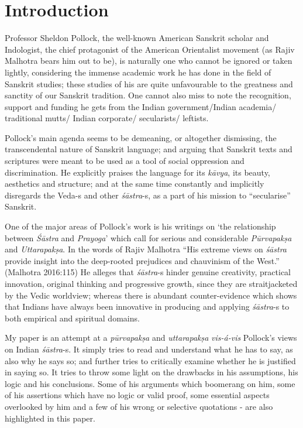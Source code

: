 \vskip -12pt

\section*{Introduction}

Professor Sheldon Pollock, the well-known American Sanskrit scholar and Indologist, the chief protagonist of the American Orientalist movement (as Rajiv Malhotra bears him out to be), is naturally one who cannot be ignored or taken lightly, considering the immense academic work he has done in the field of Sanskrit studies; these studies of his are quite unfavourable to the greatness and sanctity of our Sanskrit tradition. One cannot also miss to note the recognition, support and funding he gets from the Indian government/Indian academia/ traditional mutts/ Indian corporate/ secularists/ leftists.

Pollock's main agenda seems to be demeaning, or altogether dismissing, the transcendental nature of Sanskrit language; and arguing that Sanskrit texts and scriptures were meant to be used as a tool of social oppression and discrimination. He explicitly praises the language for its {\sl kāvya}, its beauty, aesthetics and structure; and at the same time constantly and implicitly disregards the Veda-s and other {\sl śāstra}-s, as a part of his mission to ``secularise'' Sanskrit. 

One of the major areas of Pollock's work is his writings on `the relationship between {\sl Śāstra} and {\sl Prayoga}' which call for serious and considerable {\sl Pūrvapakṣa} and {\sl Uttarapakṣa}. In the words of Rajiv Malhotra ``His extreme views on {\sl śāstra} provide insight into the deep-rooted prejudices and chauvinism of the West.'' (Malhotra 2016:115) He alleges that {\sl śāstra}-s hinder genuine creativity, practical innovation, original thinking and progressive growth, since they are straitjacketed by the Vedic worldview; whereas there is abundant counter-evidence which shows that Indians have always been innovative in producing and applying {\sl śāstra}-s to both empirical and spiritual domains.

My paper is an attempt at a {\sl pūrvapakṣa} and {\sl uttarapakṣa} {\em vis-á-vis} Pollock's views on Indian {\sl śāstra}-s. It simply tries to read and understand what he has to say, as also why he says so; and further tries to critically examine whether he is justified in saying so. It tries to throw some light on the drawbacks in his assumptions, his logic and his conclusions. Some of his arguments which boomerang on him, some of his assertions which have no logic or valid proof, some essential aspects overlooked by him and a few of his wrong or selective quotations  - are also highlighted in this paper. 

